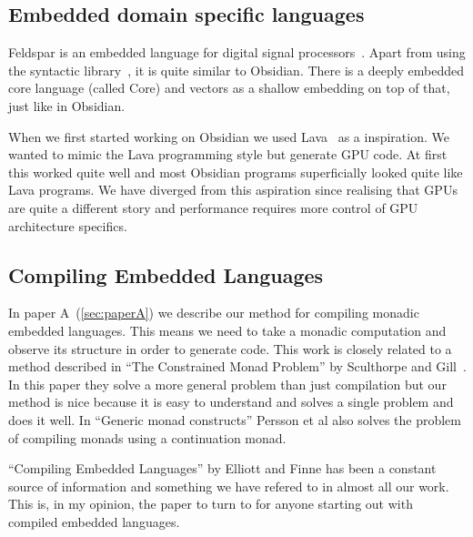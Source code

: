 \documentclass[a4paper]{book}
\begin{document}
\subsection{Embedded domain specific languages} 

Feldspar is an embedded language for digital signal processors~\citet{FELDSPAR}. Apart 
from using the syntactic library~\citet{SyntacticICFP12}, it is quite similar to Obsidian. 
There is a deeply embedded core language (called Core) and vectors as a shallow embedding 
on top of that, just like in Obsidian.

When we first started working on Obsidian we used Lava~\citet{LavaICFP} as a inspiration. 
We wanted to mimic the Lava programming style but generate GPU code. At first this worked quite 
well and most Obsidian programs superficially looked quite like Lava programs. We have diverged 
from this aspiration since realising that GPUs are quite a different story and performance 
requires more control of GPU architecture specifics. 

\subsection{Compiling Embedded Languages}

In paper A~(\ref{sec:paperA}) we describe our method for compiling monadic embedded languages. 
This means we need to take a monadic computation and observe its structure in order to generate
code. This work is closely related to a method described in ``The Constrained Monad Problem''
by Sculthorpe and Gill~\citet{sculthorpe2013constrained}. In this paper they solve a more 
general problem than just compilation but our method is nice because it is easy to understand 
and solves a single problem and does it well. In ``Generic monad constructs'' Persson et al 
also solves the problem of compiling monads using a continuation monad. 

``Compiling Embedded Languages'' by Elliott and Finne has been a constant source of information 
and something we have refered to in almost all our work. This is, in my opinion, the paper to turn 
to for anyone starting out with compiled embedded languages. 
\end{document}
